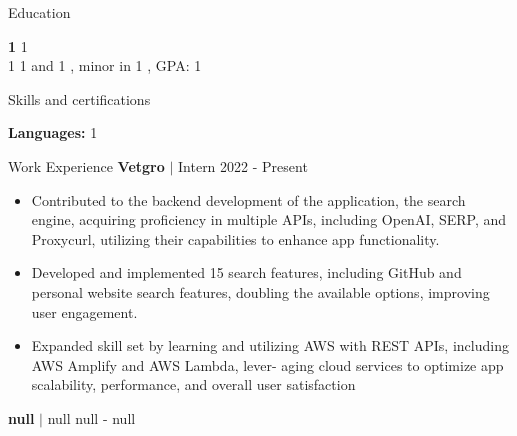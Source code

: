 \documentclass{resume} %
\newcommand{\myaddress}{%
  1 $\vert$ 1 $\vert$ 1 $\vert$ \href{1}{\underline{1}} %
}
\begin{document}
\printaddress{\myaddress}

\vspace{-0.9em}
\begin{rSection}{Education}

{\bf 1} \hfill {1}
\\
1 1 and 1%
, minor in 1%
, GPA: 1
\\

\end{rSection}


\vspace{-0.4em}
\begin{rSection}{Skills and certifications}

{\textbf{Languages: }1
}

\end{rSection}



\vspace{-0.4em}

\begin{rSection}{Work Experience}
{\textbf{Vetgro} $\vert$ Intern} \hfill 2022 - Present \\\vspace{-1.5em}
\begin{itemize}
\item Contributed to the backend development of the application, the search engine, acquiring proficiency in multiple APIs, including OpenAI, SERP, and Proxycurl, utilizing their capabilities to enhance app functionality.
\vspace{-0.4em}
\item Developed and implemented 15 search features, including GitHub and personal website search features, doubling the available options, improving user engagement.
\vspace{-0.4em}
\item Expanded skill set by learning and utilizing AWS with REST APIs, including AWS Amplify and AWS Lambda, lever- aging cloud services to optimize app scalability, performance, and overall user satisfaction
\vspace{-0.4em}
\end{itemize}
{\textbf{null} $\vert$ null} \hfill null - null \\\end{rSection}
\end{document}
